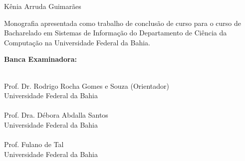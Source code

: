 \documentclass[12pt, a4paper]{report}
\begin{document}
\newpage
\begin{center}
\vspace{1.3 cm}
\par{}

\vspace{2cm}

\large{Kênia Arruda Guimarães}
\end{center}

\vspace{1.3 cm}

\begin{flushright}
\begin{minipage}{8.6cm} 
Monografia apresentada como trabalho de conclusão de curso para o curso de Bacharelado em Sistemas de Informação do Departamento de Ciência da Computação na Universidade Federal da Bahia.
\end{minipage}
\end{flushright}
 
\vspace{1cm}
\begin{center}
\Large \textbf{Banca Examinadora:}
\end{center}
\vspace{1cm}

\begin{flushright}
\begin{minipage}[l]{12cm}
\begin{center}
\uline{\hspace{10.5cm}} \\
Prof. Dr. Rodrigo Rocha Gomes e Souza (Orientador) \\ Universidade Federal da Bahia \\
\vspace{1cm}
\uline{\hspace{10.5cm}} \\
Prof. Dra. Débora Abdalla Santos \\ Universidade Federal da Bahia \\
\vspace{1cm}
\uline{\hspace{10.5cm}} \\
Prof. Fulano de Tal \\ Universidade Federal da Bahia \\


\end{center}
\end{minipage}
\end{flushright}
\end{document}
